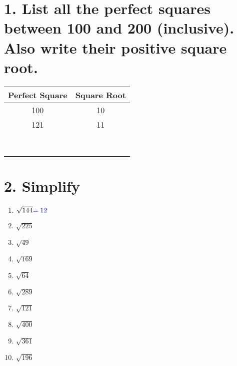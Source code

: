\documentclass[12pt,fleqn]{article}
\newcommand{\studentsmallworkspace}{\vspace{0.7cm}}
\begin{document}
\section*{\normalsize 1. List all the perfect squares between 100 and 200 (inclusive). Also write their positive square root.}
\renewcommand{\arraystretch}{2} %
\begin{center}
\begin{tabular}{|c|c|}
    \hline
    Perfect Square & Square Root \\
    \hline
    100 & 10 \\
    \hline
    121 & 11 \\
    \hline
    & \\
    \hline
    & \\
    \hline
    & \\
    \hline
    & \\
    \hline
    & \\
    \hline
    & \\
    \hline
    & \\
    \hline
    & \\
    \hline
\end{tabular}
\end{center}


\section*{\normalsize 2. Simplify}
\begin{enumerate}[label=\alph*.]
    \item $\sqrt{144} \textcolor{blue}{= 12}$
        \studentsmallworkspace
    \item $\sqrt{225}$
        \studentsmallworkspace
    \item $\sqrt{49}$
        \studentsmallworkspace
    \item $\sqrt{169}$
        \studentsmallworkspace
    \item $\sqrt{64}$
        \studentsmallworkspace
    \item $\sqrt{289}$
        \studentsmallworkspace
    \item $\sqrt{121}$
        \studentsmallworkspace
    \item $\sqrt{400}$
        \studentsmallworkspace
    \item $\sqrt{361}$
        \studentsmallworkspace
    \item $\sqrt{196}$
        \studentsmallworkspace
\end{enumerate}
\end{document}
